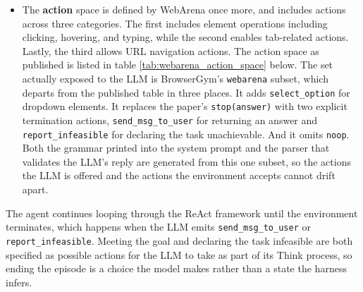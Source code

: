 \begin{itemize}
\begin{itemize}
\begin{itemize}
        thoughts, and outcomes from this trajectory. The outcome of each step is
        either \texttt{ok}, if the step was completed without an error message,
        or the specific failure, which is the error returned by BrowserGym, the
        exception the step raised, or the parse error the reply produced. These
        are the working memory which enable it to learn from previous actions,
        and work towards its goal.
        \item Accessibility tree. As discussed above, the LLM is passed the
        website observation in the form of an accessibility tree.
        \item Instruction. The end of the user prompt is a single sentence:
        \textit{``Reply with exactly one BrowserGym action line.''} This pushes
        the LLM to respond with a single action item that can be parsed for the
        action step.
    \end{itemize}
\end{itemize}
    \item The \textbf{action} space is defined by WebArena once more, and
    includes actions across three categories. The first includes element
    operations including clicking, hovering, and typing, while the second
    enables tab-related actions. Lastly, the third allows URL navigation
    actions. The action space as published is listed in table
    \ref{tab:webarena_action_space} below.
    The set actually exposed to the LLM is BrowserGym's \texttt{webarena}
    subset, which departs from the published table in three places. It adds
    \texttt{select\_option} for dropdown elements. It replaces the paper's
    \texttt{stop(answer)} with two explicit termination actions,
    \texttt{send\_msg\_to\_user} for returning an answer and
    \texttt{report\_infeasible} for declaring the task unachievable. And it
    omits \texttt{noop}. Both the grammar printed into the system prompt and the
    parser that validates the LLM's reply are generated from this one subset, so
    the actions the LLM is offered and the actions the environment accepts
    cannot drift apart.
\end{itemize}

The agent continues looping through the ReAct framework until the environment
terminates, which happens when the LLM emits \texttt{send\_msg\_to\_user} or
\texttt{report\_infeasible}. Meeting the goal and declaring the task infeasible
are both specified as possible actions for the LLM to take as part of its Think
process, so ending the episode is a choice the model makes rather than a state
the harness infers.

